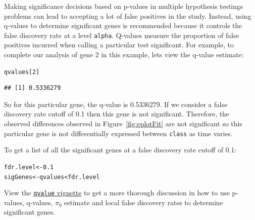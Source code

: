 \documentclass{article}\usepackage[]{graphicx}\usepackage[]{color}
\makeatletter
\newcommand{\hlnum}[1]{\textcolor[rgb]{0.686,0.059,0.569}{#1}}%
\newcommand{\hlopt}[1]{\textcolor[rgb]{0,0,0}{#1}}%
\newcommand{\hlstd}[1]{\textcolor[rgb]{0.345,0.345,0.345}{#1}}%
\newcommand{\hlkwb}[1]{\textcolor[rgb]{0.69,0.353,0.396}{#1}}%
\newenvironment{kframe}{%
 \def\at@end@of@kframe{}%
 \ifinner\ifhmode%
  \def\at@end@of@kframe{\end{minipage}}%
  \begin{minipage}{\columnwidth}%
 \fi\fi%
 \def\FrameCommand##1{\hskip\@totalleftmargin \hskip-\fboxsep
 \colorbox{shadecolor}{##1}\hskip-\fboxsep
     \hskip-\linewidth \hskip-\@totalleftmargin \hskip\columnwidth}%
 \MakeFramed {\advance\hsize-\width
   \@totalleftmargin\z@ \linewidth\hsize
   \@setminipage}}%
 {\par\unskip\endMakeFramed%
 \at@end@of@kframe}
\newenvironment{knitrout}{}{} %
\makeatother
\begin{document}
Making significance decisions based on p-values in multiple hypothesis testings problems can lead to accepting a lot of false positives in the study. Instead, using q-values to determine significant genes is recommended because it controls the false discovery rate at a level {\tt alpha}. Q-values measure the proportion of false positives incurred when calling a particular test significant. For example, to complete our analysis of gene 2 in this example, lets view the q-value estimate:
\begin{knitrout}
\color{fgcolor}\begin{kframe}
\begin{alltt}
\hlstd{qvalues[}\hlnum{2}\hlstd{]}
\end{alltt}
\begin{verbatim}
## [1] 0.5336279
\end{verbatim}
\end{kframe}
\end{knitrout}

So for this particular gene, the q-value is 0.5336279. If we consider a false discovery rate cutoff of 0.1 then this gene is not significant. Therefore, the observed differences observed in Figure~\ref{fig:eplotFit} are not significant so this particular gene is not differentially expressed between {\tt class} as time varies. 

To get a list of all the significant genes at a false discovery rate cutoff of 0.1:
\begin{knitrout}
\color{fgcolor}\begin{kframe}
\begin{alltt}
\hlstd{fdr.level} \hlkwb{<-} \hlnum{0.1}
\hlstd{sigGenes} \hlkwb{<-} \hlstd{qvalues} \hlopt{<} \hlstd{fdr.level}
\end{alltt}
\end{kframe}
\end{knitrout}

View the \href{http://www.bioconductor.org/packages/release/bioc/html/qvalue.html}{{\tt qvalue} vignette} to get a more thorough discussion in how to use p-values, q-values, $\pi_{0}$ estimate and local false discovery rates to determine significant genes.
\end{document}

